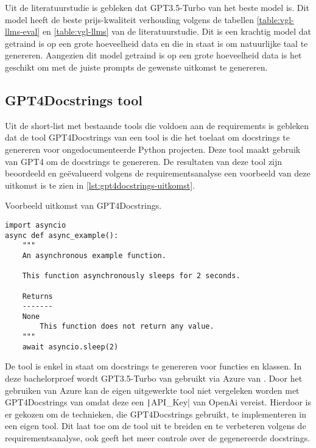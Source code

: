 Uit de literatuurstudie is gebleken dat GPT3.5-Turbo van \textcite{OpenAi2024} het beste model is. 
Dit model heeft de beste prijs-kwaliteit verhouding volgens de tabellen \ref{table:vgl-llms-eval} en \ref{table:vgl-llms} van de literatuurstudie.
Dit is een krachtig model dat getraind is op een grote hoeveelheid data en die in staat is om natuurlijke taal te genereren.
Aangezien dit model getraind is op een grote hoeveelheid data is het geschikt om met de juiste prompts de gewenste uitkomst te genereren.


\subsection{GPT4Docstrings tool}
\label{sec:bestanddocumentatie-tool}
Uit de short-list met bestaande tools die voldoen aan de requirements is gebleken dat de tool GPT4Docstrings van \textcite{Trofficus2023} een tool is die het toelaat om docstrings te genereren voor ongedocumenteerde Python projecten.
Deze tool maakt gebruik van GPT4 \autocite{OpenAI2023} om de docstrings te genereren.
De resultaten van deze tool zijn beoordeeld en geëvalueerd volgens de requirementsanalyse een voorbeeld van deze uitkomst is te zien in \ref{lst:gpt4docstrings-uitkomst}.

\begin{listing}
    \caption{Voorbeeld uitkomst van GPT4Docstrings. \autocite{Trofficus2023}}
    \label{lst:gpt4docstrings-uitkomst}
    \begin{verbatim}
import asyncio
async def async_example():
    """
    An asynchronous example function.

    This function asynchronously sleeps for 2 seconds.

    Returns
    -------
    None
        This function does not return any value.
    """
    await asyncio.sleep(2)
    \end{verbatim}
\end{listing}

De tool is enkel in staat om docstrings te genereren voor functies en klassen.
In deze bachelorproef wordt GPT3.5-Turbo van \textcite{OpenAi2024} gebruikt via Azure van \textcite{Microsoft2024}.
Door het gebruiken van Azure kan de eigen uitgewerkte tool niet vergeleken worden met GPT4Docstrings van \textcite{Trofficus2023} omdat deze een \texttt|API_Key| van OpenAi \autocite{OpenAi2024} vereist.
Hierdoor is er gekozen om de technieken, die GPT4Docstrings gebruikt, te implementeren in een eigen tool.
Dit laat toe om de tool uit te breiden en te verbeteren volgens de requirementsanalyse, ook geeft het meer controle over de gegenereerde docstrings.

